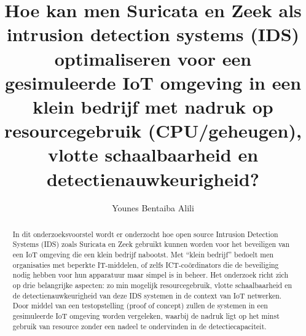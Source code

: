 \documentclass{hogent-article}
\title{Hoe kan men Suricata en Zeek als intrusion detection systems (IDS) optimaliseren voor een gesimuleerde IoT omgeving in een klein bedrijf met nadruk op resourcegebruik (CPU/geheugen), vlotte schaalbaarheid en detectienauwkeurigheid?}
\author{Younes Bentaiba Alili}
\begin{document}
\begin{abstract}
  In dit onderzoeksvoorstel wordt er onderzocht hoe open source Intrusion Detection Systems (IDS) zoals Suricata en Zeek gebruikt kunnen worden voor het beveiligen van een IoT omgeving die een klein bedrijf nabootst.  Met “klein bedrijf” bedoelt men organisaties met beperkte IT-middelen, of zelfs ICT-coördinators die de beveiliging nodig hebben voor hun apparatuur maar simpel is in beheer. Het onderzoek richt zich op drie belangrijke aspecten: zo min mogelijk resourcegebruik, vlotte schaalbaarheid en de detectienauwkeurigheid van deze IDS systemen in de context van IoT netwerken. Door middel van een testopstelling (proof of concept) zullen de systemen in een gesimuleerde IoT omgeving worden vergeleken, waarbij de nadruk ligt op het minst gebruik van resource zonder een nadeel te ondervinden in de detectiecapaciteit.
\end{abstract}

\tableofcontents



\printbibliography[heading=bibintoc]
\end{document}
